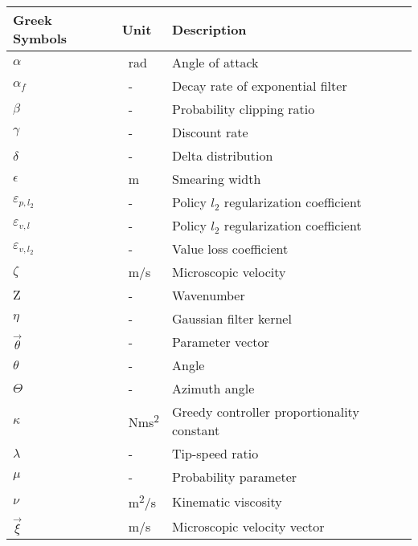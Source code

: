 \vspace{0.5cm}
\begin{longtable}{p{5cm}p{4cm}p{5cm}}
	Greek Symbols    	& Unit       		& Description             \\ \hline
	$\alpha$			& \SI{}{rad}		& Angle of attack \\
	$\alpha_f$			& \SI{}{-}			& Decay rate of exponential filter \\
	$\beta$				& \SI{}{-}			& Probability clipping ratio \\
	$\gamma$			& \SI{}{-}			& Discount rate \\
	$\delta$			& \SI{}{-}			& Delta distribution \\
	$\epsilon$			& \SI{}{m}			& Smearing width \\
	$\varepsilon_{p,l_2}$& \SI{}{-}			& Policy $l_2$ regularization coefficient \\ 
	$\varepsilon_{v,l}$& \SI{}{-}			& Policy $l_2$ regularization coefficient \\ 
	$\varepsilon_{v,l_2}$& \SI{}{-}			& Value loss coefficient \\ 
	$\zeta$				& \SI{}{m/s}		& Microscopic velocity \\
    $\mathrm{Z}$		& \SI{}{-}			& Wavenumber \\
	$\eta$				& \SI{}{-}			& Gaussian filter kernel \\
	$\vec{\theta}$		& \SI{}{-}			& Parameter vector \\
	$\theta$			& \SI{}{-}			& Angle \\
	$\Theta$			& \SI{}{-}			& Azimuth angle \\
	$\kappa$			& \SI{}{Nms^2}		& Greedy controller proportionality constant \\
	$\lambda$			& \SI{}{-}			& Tip-speed ratio \\
    $\mu$               & \SI{}{-}     		& Probability parameter \\
    $\nu$               & \SI{}{m^2/s}      & Kinematic viscosity  \\
    $\vec{\xi}$         & \SI{}{m/s}        & Microscopic velocity vector \\

\end{longtable}
